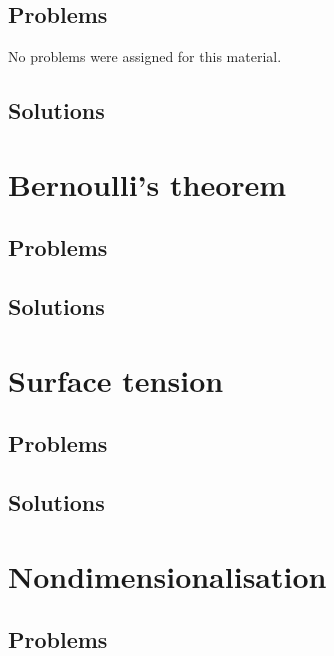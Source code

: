    \section{Problems}
      No problems were assigned for this material.
   \section{Solutions}
      \shipoutAnswer

\chapter{Bernoulli's theorem}
   
   
   \section{Problems}
      
      
   \section{Solutions}
      \shipoutAnswer

\chapter{Surface tension}
   
   \section{Problems}
      
   \section{Solutions}
      \shipoutAnswer

\chapter{Nondimensionalisation}
   
   
   
   \section{Problems}
      
